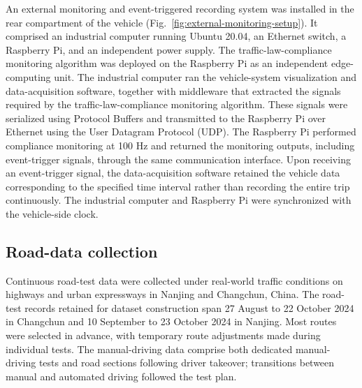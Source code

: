\documentclass[pdflatex,sn-mathphys-num]{sn-jnl}
\begin{document}
An external monitoring and event-triggered recording system was installed in the rear compartment of the vehicle (Fig.~\ref{fig:external-monitoring-setup}). It comprised an industrial computer running Ubuntu 20.04, an Ethernet switch, a Raspberry Pi, and an independent power supply. The traffic-law-compliance monitoring algorithm was deployed on the Raspberry Pi as an independent edge-computing unit.
The industrial computer ran the vehicle-system visualization and data-acquisition software, together with middleware that extracted the signals required by the traffic-law-compliance monitoring algorithm. These signals were serialized using Protocol Buffers and transmitted to the Raspberry Pi over Ethernet using the User Datagram Protocol (UDP). The Raspberry Pi performed compliance monitoring at 100 Hz and returned the monitoring outputs, including event-trigger signals, through the same communication interface. Upon receiving an event-trigger signal, the data-acquisition software retained the vehicle data corresponding to the specified time interval rather than recording the entire trip continuously. The industrial computer and Raspberry Pi were synchronized with the vehicle-side clock.



\subsection{Road-data collection}\label{subsec:road-data-collection}

Continuous road-test data were collected under real-world traffic conditions on highways and urban expressways in Nanjing and Changchun, China. The road-test records retained for dataset construction span 27 August to 22 October 2024 in Changchun and 10 September to 23 October 2024 in Nanjing. Most routes were selected in advance, with temporary route adjustments made during individual tests. The manual-driving data comprise both dedicated manual-driving tests and road sections following driver takeover; transitions between manual and automated driving followed the test plan.
\end{document}
